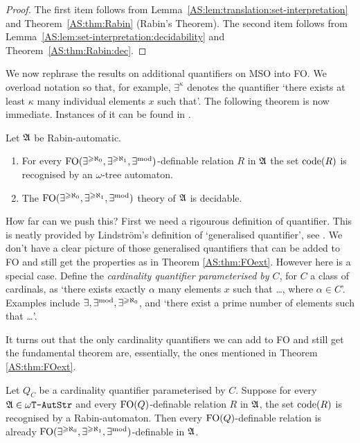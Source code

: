 \begin{proof}
The first item follows from Lemma~\ref{AS:lem:translation:set-interpretation} and Theorem~\ref{AS:thm:Rabin} (Rabin's Theorem). The second item follows from Lemma~\ref{AS:lem:set-interpretation:decidability} and Theorem~\ref{AS:thm:Rabin:dec}.
\end{proof}

We now rephrase the results on additional quantifiers on MSO into FO. We overload notation so that, for example, $\exists^\kappa$ denotes the quantifier `there exists at least $\kappa$ many individual elements $x$ such that'. The following theorem is now immediate. Instances of it can be found in \cite{BlGr00,KRS04,KuLo08JSL}.

\begin{theorem} \label{AS:thm:FOext}
Let $\mathfrak{A}$ be Rabin-automatic.
\begin{enumerate}
\item For every $\mbox{\rm FO}(\exists^{\geqslant \aleph_0},\exists^{\geqslant \aleph_1},\exists^{\rm mod})$-definable relation $R$ in $\mathfrak{A}$ the set ${\rm code}({R})$ is recognised by an $\omega$-tree  automaton.
\item The $\mbox{\rm FO}(\exists^{\geqslant \aleph_0},\exists^{\geqslant \aleph_1},\exists^{\rm mod})$ theory of $\mathfrak{A}$ is decidable.
\end{enumerate}
\end{theorem}

How far can we push this? First we need a rigourous definition of quantifier.
This is neatly provided by Lindstr\"om's definition of `generalised quantifier',
see \cite{Lind66}. We don't have a clear picture of those generalised quantifiers that can
be added to FO and still get the properties as in Theorem \ref{AS:thm:FOext}.
However here is a special case. Define the
{\em cardinality quantifier parameterised by $C$}, for $C$  a class of
cardinals, as `there exists exactly $\alpha$ many elements $x$ such that \ldots,
where $\alpha \in C$'. Examples include $\exists, \exists^{\text{mod}},\exists^{\geqslant \aleph_0}$, and
`there exist a prime number of elements such that \dots'.

It turns out that the only cardinality quantifiers we can add to FO and still get the fundamental theorem are, essentially, 
the ones mentioned in Theorem \ref{AS:thm:FOext}.

\begin{theorem} 
Let $Q_C$ be a cardinality quantifier parameterised by $C$.  Suppose for every
$\mathfrak{A} \in \mbox{\tt $\omega$T-AutStr}$ and every $\mbox{\rm FO}(Q)$-definable relation $R$ in $\mathfrak{A}$,
the set ${\rm code}({R})$ is recognised by a Rabin-automaton.  Then every $\mbox{\rm FO}(Q)$-definable relation 
is already $\mbox{\rm FO}(\exists^{\geqslant \aleph_0},\exists^{\geqslant \aleph_1},\exists^{\rm mod})$-definable in $\mathfrak{A}$. 
\end{theorem}


